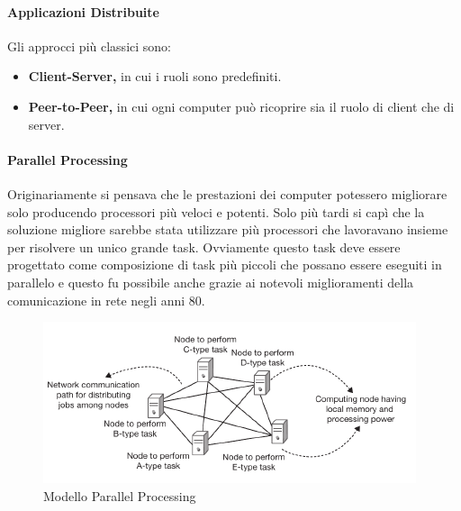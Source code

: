 \documentclass{article}
\begin{document}
\paragraph{Applicazioni Distribuite}
Gli approcci più classici sono:
\begin{itemize}
    \item \textbf{Client-Server,} in cui i ruoli sono predefiniti.
    \item \textbf{Peer-to-Peer,} in cui ogni computer può ricoprire sia il ruolo di client che di server.
\end{itemize}

\paragraph{Parallel Processing}
Originariamente si pensava che le prestazioni dei computer potessero migliorare solo producendo processori più veloci e potenti. Solo più tardi si capì che la soluzione migliore sarebbe stata utilizzare più processori che lavoravano insieme per risolvere un unico grande task. Ovviamente questo task deve essere progettato come composizione di task più piccoli che possano essere eseguiti in parallelo e questo fu possibile anche grazie ai notevoli miglioramenti della comunicazione in rete negli anni 80.

\begin{figure}[H]
    \centering
    \includegraphics[scale=1]{img/pp.png}
    \caption{Modello Parallel Processing}
\end{figure}
\end{document}
